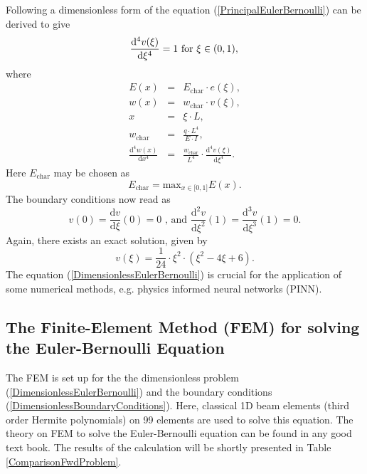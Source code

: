 \documentclass[a4paper,11pt]{article}
\begin{document}
Following \cite[pp. 3]{hoffmann2014modellierung} a dimensionless form of the equation (\ref{PrincipalEulerBernoulli}) can be derived to give
\begin{equation} \label{DimensionlessEulerBernoulli}
\frac{\mathrm{d}^4 v(\xi)}{\mathrm{d}\xi^4} = 1 \text{ for } \xi \in (0,1),\\
\end{equation}
where
\begin{eqnarray*}
E (x) &=& E_{\mathrm{char}} \cdot e(\xi ) , \\
w(x) &=& w_{\mathrm{char}} \cdot v(\xi ) , \\
x &=& \xi\cdot L, \\
w_{\mathrm{char}} & = & \frac{q\cdot L^4}{E\cdot I }, \\
\frac{\mathrm{d}^4 w(x)}{\mathrm{d}x^4} & = & \frac{w_{\mathrm{char}}}{L^4}\cdot \frac{\mathrm{d}^4 v(\xi)}{\mathrm{d}\xi^4}.
\end{eqnarray*}
Here $E_{\mathrm{char}} $ may be chosen as 
\begin{equation*}
E_{\mathrm{char}} = \mathrm{max}_{x\in \lbrack 0,1 \rbrack } E(x) .
\end{equation*}
The boundary conditions now read as
\begin{equation} \label{DimensionlessBoundaryConditions}
v( 0) = \frac{\mathrm{d} v}{\mathrm{d}\xi }(0) = 0 \text{ , and } \frac{\mathrm{d}^2 v}{\mathrm{d}\xi^2}(1) = \frac{\mathrm{d}^3 v}{\mathrm{d}\xi^3}(1) = 0.
\end{equation}
Again, there exists an exact solution, given by
\begin{equation*} 
v(\xi ) = \frac{1}{24} \cdot \xi^2 \cdot \left( \xi^2 -4 \xi + 6 \right) .
\end{equation*}
The equation (\ref{DimensionlessEulerBernoulli}) is crucial for the application of some numerical methods, e.g. physics informed neural networks (PINN).


\subsection*{The Finite-Element Method (FEM) for solving the Euler-Bernoulli Equation}
The FEM is set up for the the dimensionless problem (\ref{DimensionlessEulerBernoulli}) and the boundary conditions (\ref{DimensionlessBoundaryConditions}). Here, classical 1D beam elements (third order Hermite polynomials) on 99 elements are used to solve this equation. The theory on FEM to solve the Euler-Bernoulli equation can be found in any good text book.
The results of the calculation will be shortly presented in Table \ref{ComparisonFwdProblem}.
\end{document}
